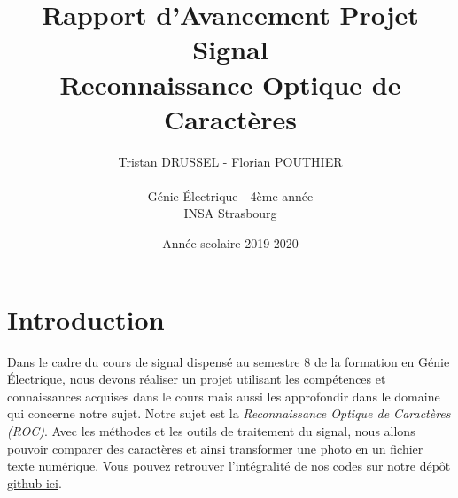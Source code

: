 \documentclass[a4paper,12pt,titlepage]{report}
\title{Rapport d'Avancement Projet Signal\\Reconnaissance Optique de Caractères}
\author{Tristan DRUSSEL - Florian POUTHIER \\ \\ Génie Électrique - 4ème année\\ INSA Strasbourg}
\date{Année scolaire 2019-2020}
\begin{document}
	\begin{titlepage}
		\maketitle
	\end{titlepage}
	\tableofcontents
	\newpage
	\section{Introduction}
		Dans le cadre du cours de signal dispensé au semestre 8 de la formation en Génie Électrique, nous devons réaliser un projet utilisant les compétences et connaissances acquises dans le cours mais aussi les approfondir dans le domaine qui concerne notre sujet.
		Notre sujet est la \textit{Reconnaissance Optique de Caractères (ROC)}. Avec les méthodes et les outils de traitement du signal, nous allons pouvoir comparer des caractères et ainsi transformer une photo en un fichier texte numérique. Vous pouvez retrouver l'intégralité de nos codes sur notre dépôt \href{https://github.com/tristanplouz/ProjetSignal}{github ici}.
\end{document}
